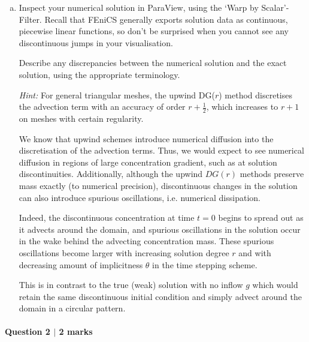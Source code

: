 \begin{enumerate}[(a)]
\item Inspect your numerical solution in \textsf{ParaView}, using the `Warp by Scalar'-Filter. Recall that \textsf{FEniCS} generally exports solution data as continuous, piecewise linear functions, so don't be surprised when you cannot see any discontinuous jumps in your visualisation.

Describe any discrepancies between the numerical solution and the exact solution, using the appropriate terminology.

\emph{Hint: } For general triangular meshes, the upwind DG($r$) method discretises the advection term with an accuracy of order $r+\frac{1}{2}$, which increases to $r+1$ on meshes with certain regularity.

\vspace{0.5cm}
\begin{solution}
We know that upwind schemes introduce numerical diffusion into the discretisation of the advection terms.
Thus, we would expect to see numerical diffusion in regions of large concentration gradient, such as at solution discontinuities.
Additionally, although the upwind $DG(r)$ methods preserve mass exactly (to numerical precision), discontinuous changes in the solution can also introduce spurious oscillations, i.e. numerical dissipation.

Indeed, the discontinuous concentration at time $t=0$ begins to spread out as it advects around the domain, and spurious oscillations in the solution occur in the wake behind the advecting concentration mass.
These spurious oscillations become larger with increasing solution degree $r$ and with decreasing amount of implicitness $\theta$ in the time stepping scheme.

This is in contrast to the true (weak) solution with no inflow $g$ which would retain the same discontinuous initial condition and simply advect around the domain in a circular pattern.

\end{solution}

\end{enumerate}

\newpage

\paragraph*{Question 2 $\vert$ 2 marks}%

